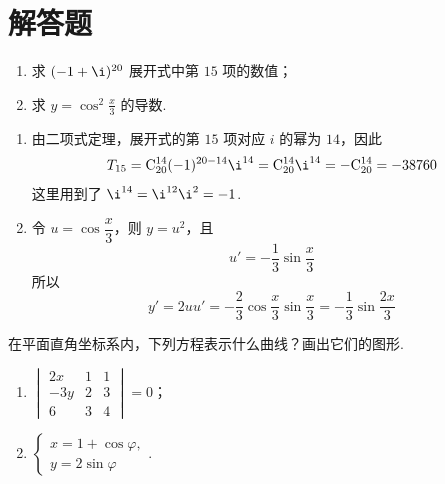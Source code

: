 \documentclass[UTF8,a4paper,oneside,11pt]{ctexbook}
\begin{document}
\section{解答题}

\begin{problem}

\begin{enumerate}
\item 求 \((-1+\i)^{20}\) 展开式中第 \(15\) 项的数值；
\item 求 \(y=\cos^2 \frac{x}{3}\) 的导数.
\end{enumerate}
\end{problem}

\begin{solution}
\begin{enumerate}
\item 由二项式定理，展开式的第 \(15\) 项对应 \(i\) 的幂为 \(14\)，因此
\[
T_{15}=\mathrm C_{20}^{14}(-1)^{20-14}\i^{14}=\mathrm C_{20}^{14}\i^{14}=-\mathrm C_{20}^{14}=-38760
\]
这里用到了 \(\i^{14}=\i^{12}\i^2=-1\).
\item 令 \(u=\cos\dfrac{x}{3}\)，则 \(y=u^2\)，且
\[
u'=-\dfrac{1}{3}\sin\dfrac{x}{3}
\]
所以
\[
y'=2u u'=-\dfrac{2}{3}\cos\dfrac{x}{3}\sin\dfrac{x}{3}=-\dfrac{1}{3}\sin\dfrac{2x}{3}
\]
\end{enumerate}
\end{solution}

\begin{problem}

在平面直角坐标系内，下列方程表示什么曲线？画出它们的图形.

\begin{enumerate}
\item \(\begin{vmatrix} 2x & 1 & 1 \\ -3y & 2 & 3 \\ 6 & 3 & 4 \end{vmatrix}=0\)；
\item \(\begin{cases}
x=1+\cos \varphi,\\
y=2\sin \varphi
\end{cases}\).
\end{enumerate}
\end{problem}
\end{document}
